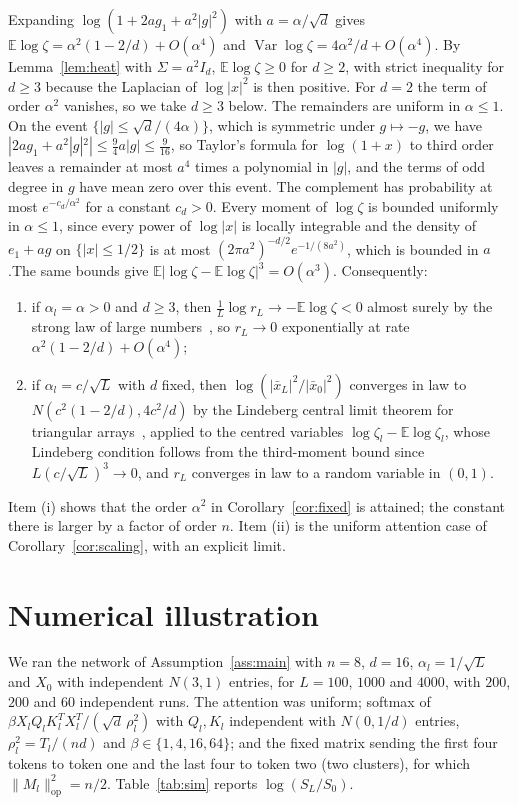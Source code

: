 \documentclass[11pt]{amsart}
\theoremstyle{definition}
\theoremstyle{remark}
\numberwithin{equation}{section}
\newcommand{\EE}{\mathbb{E}}
\newcommand{\op}{\mathrm{op}}
\begin{document}
Expanding $\log(1+2ag_1+a^2|g|^2)$ with $a=\alpha/\sqrt d$ gives $\EE\log\zeta=\alpha^2(1-2/d)+O(\alpha^4)$ and $\operatorname{Var}\log\zeta=4\alpha^2/d+O(\alpha^4)$. By Lemma~\ref{lem:heat} with $\Sigma=a^2I_d$, $\EE\log\zeta\ge0$ for $d\ge2$, with strict inequality for $d\ge3$ because the Laplacian of $\log|x|^2$ is then positive. For $d=2$ the term of order $\alpha^2$ vanishes, so we take $d\ge3$ below. The remainders are uniform in $\alpha\le1$. On the event $\{|g|\le\sqrt d/(4\alpha)\}$, which is symmetric under $g\mapsto-g$, we have $|2ag_1+a^2|g|^2|\le\frac94a|g|\le\frac9{16}$, so Taylor's formula for $\log(1+x)$ to third order leaves a remainder at most $a^4$ times a polynomial in $|g|$, and the terms of odd degree in $g$ have mean zero over this event. The complement has probability at most $e^{-c_d/\alpha^2}$ for a constant $c_d>0$. Every moment of $\log\zeta$ is bounded uniformly in $\alpha\le1$, since every power of $\log|x|$ is locally integrable and the density of $e_1+ag$ on $\{|x|\le1/2\}$ is at most $(2\pi a^2)^{-d/2}e^{-1/(8a^2)}$, which is bounded in $a$.The same bounds give $\EE|\log\zeta-\EE\log\zeta|^3=O(\alpha^3)$. Consequently:
\begin{enumerate}[label=(\roman*)]
\item if $\alpha_l=\alpha>0$ and $d\ge3$, then $\frac1L\log r_L\to-\EE\log\zeta<0$ almost surely by the strong law of large numbers~\cite[Section~22]{Bil}, so $r_L\to0$ exponentially at rate $\alpha^2(1-2/d)+O(\alpha^4)$;
\item if $\alpha_l=c/\sqrt L$ with $d$ fixed, then $\log(|\bar x_L|^2/|\bar x_0|^2)$ converges in law to $N(c^2(1-2/d),4c^2/d)$ by the Lindeberg central limit theorem for triangular arrays~\cite[Theorem~27.2]{Bil}, applied to the centred variables $\log\zeta_l-\EE\log\zeta_l$, whose Lindeberg condition follows from the third-moment bound since $L(c/\sqrt L)^3\to0$, and $r_L$ converges in law to a random variable in $(0,1)$.
\end{enumerate}
Item (i) shows that the order $\alpha^2$ in Corollary~\ref{cor:fixed} is attained; the constant there is larger by a factor of order $n$. Item (ii) is the uniform attention case of Corollary~\ref{cor:scaling}, with an explicit limit.

\section{Numerical illustration}\label{sec:numerics}

We ran the network of Assumption~\ref{ass:main} with $n=8$, $d=16$, $\alpha_l=1/\sqrt L$ and $X_0$ with independent $N(3,1)$ entries, for $L=100$, $1000$ and $4000$, with $200$, $200$ and $60$ independent runs. The attention was uniform; softmax of $\beta X_lQ_lK_l^{T}X_l^{T}/(\sqrt d\,\rho_l^2)$ with $Q_l,K_l$ independent with $N(0,1/d)$ entries, $\rho_l^2=T_l/(nd)$ and $\beta\in\{1,4,16,64\}$; and the fixed matrix sending the first four tokens to token one and the last four to token two (two clusters), for which $\|M_l\|_\op^2=n/2$. Table~\ref{tab:sim} reports $\log(S_L/S_0)$.
\end{document}
